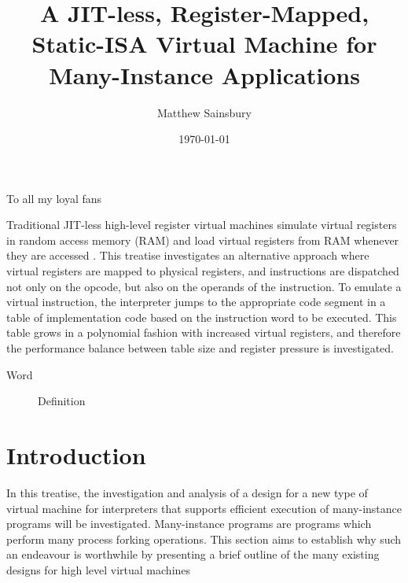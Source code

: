 



\title{A JIT-less, Register-Mapped, Static-ISA Virtual Machine for Many-Instance Applications}
\author{Matthew Sainsbury}
\date{\today}

\begin{titlepage}

		\maketitle
	
\end{titlepage}


	To all my loyal fans

	Traditional JIT-less high-level register virtual machines simulate virtual registers in random access memory (RAM) and load virtual registers from RAM whenever they are accessed \citep{caseregistervm}. This treatise investigates an alternative approach where virtual registers are mapped to physical registers, and instructions are dispatched not only on the opcode, but also on the operands of the instruction. To emulate a virtual instruction, the interpreter jumps to the appropriate code segment in a table of implementation code based on the instruction word to be executed. This table grows in a polynomial fashion with increased virtual registers, and therefore the performance balance between table size and register pressure is investigated.



\tableofcontents

\begin{description}
	\item[Word] Definition
\end{description}


\chapter{Introduction}
	\startrealnumbers
	In this treatise, the investigation and analysis of a design for a new type of virtual machine for interpreters that supports efficient execution of many-instance programs will be investigated. Many-instance programs are programs which perform many process forking operations. This section aims to establish why such an endeavour is worthwhile by presenting a brief outline of the many existing designs for high level virtual machines
	
